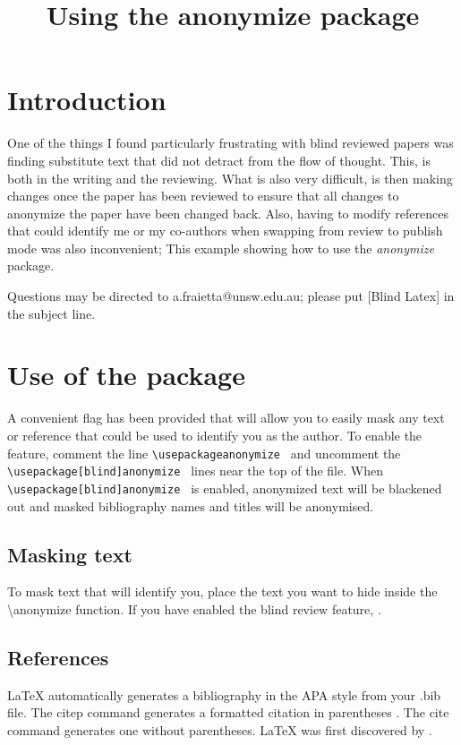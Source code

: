 \documentclass[a4paper,man,natbib]{apa6}
\title{Using the anonymize package}
\author{\anonymize{Angelo Fraietta}}
\affiliation{\anonymize{University of New South Wales}}
\begin{document}
\maketitle

\section{Introduction}

One of the things I found particularly frustrating with blind reviewed papers was finding substitute text that did not detract from the flow of thought. This, is both in the writing and the reviewing. What is also very difficult, is then making changes once the paper has been reviewed to ensure that all changes to anonymize the paper have been changed back. Also, having to modify references that could identify me or my co-authors when swapping from review to publish mode was also inconvenient;
This example showing how to use the \textit{anonymize} package. 

Questions may be directed to a.fraietta@unsw.edu.au; please put [Blind Latex] in the subject line.

\section{Use of the package}
A convenient flag has been provided that will allow you to easily mask any text or reference that could be used to identify you as the author. To enable the feature, comment the line \texttt{\textbackslash usepackage{anonymize} } and uncomment the \texttt{\textbackslash usepackage[blind]{anonymize} } lines near the top of the file. When \texttt{\textbackslash usepackage[blind]{anonymize} } is enabled, anonymized text will be blackened out and masked bibliography names and titles will be anonymised.

\subsection{Masking text}
To mask text that will identify you, place the text you want to hide inside the \textbackslash anonymize function. If you have enabled the blind review feature, . 


\subsection{References}
LaTeX automatically generates a bibliography in the APA style from your .bib file. The citep command generates a formatted citation in parentheses \citep{Lamport1986}. The cite command generates one without parentheses. LaTeX was first discovered by \cite{Lamport1986}.
\end{document}

